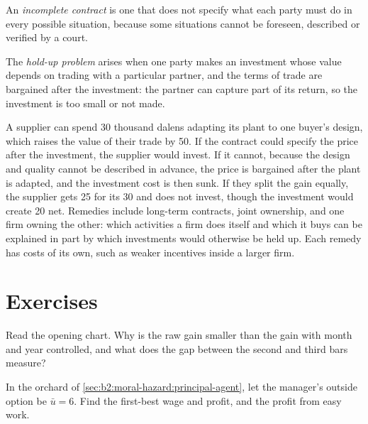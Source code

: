 \begin{definition}\label{def:b2:moral-hazard:incomplete-contract}
An \emph{incomplete contract} is one that does not specify what each party must do in every
possible situation, because some situations cannot be foreseen, described or verified by a court.
\end{definition}

\begin{definition}\label{def:b2:moral-hazard:hold-up}
The \emph{hold-up problem} arises when one party makes an investment whose value depends on
trading with a particular partner, and the terms of trade are bargained after the investment: the partner can capture
part of its return, so the investment is too small or not made.
\end{definition}

A supplier can spend 30 thousand dalens adapting its plant to one buyer's design, which raises the value of their trade by
50. If the contract could specify the price after the investment, the supplier would invest. If it cannot, because the
design and quality cannot be described in advance, the price is bargained after the plant is adapted, and the investment
cost is then sunk. If they split the gain equally, the supplier gets 25 for its 30 and does not invest, though the
investment would create 20 net. Remedies include long-term contracts, joint ownership, and one firm owning the other: which
activities a firm does itself and which it buys can be explained in part by which investments would otherwise be held up.
Each remedy has costs of its own, such as weaker incentives inside a larger firm.

\section{Exercises}\label{sec:b2:moral-hazard:exercises}

\begin{exercise}[$\star$]\label{exo:b2:moral-hazard:1}
Read the opening chart. Why is the raw gain smaller than the gain with month and year controlled, and what does the gap
between the second and third bars measure?
\end{exercise}

\begin{exercise}[$\star$]\label{exo:b2:moral-hazard:2}
In the orchard of \cref{sec:b2:moral-hazard:principal-agent}, let the manager's outside option be $\bar u = 6$. Find the first-best wage and
profit, and the profit from easy work.
\end{exercise}

